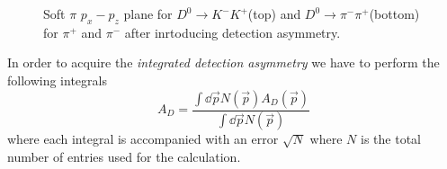 \documentclass{article}
\begin{document}
    \begin{figure}[h!]
        \centering
        \hfill
        \caption{Soft $\pi$ $p_x - p_z$ plane for $D^{0}\to K^-K^+$(top) and $D^{0}\to \pi^-\pi^+$(bottom) for $\pi^+$ and $\pi^-$ after inrtoducing detection asymmetry.}
    \end{figure}

    In order to acquire the \textit{ integrated detection asymmetry} we have to perform the following integrals
    \begin{equation}
        A_D = \frac{\int \dd \vec{p}N(\vec{p})A_D(\vec{p})}{\int \dd \vec{p}N(\vec{p})}
    \end{equation}
    where each integral is accompanied with an error $\sqrt{N}$ where $N$ is the total number of entries used for the calculation.
\end{document}
